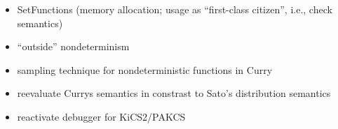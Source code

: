 \documentclass[
12pt, %
a4paper, %
oneside, %
]{llncs}
\begin{document}
\begin{itemize}
\item SetFunctions (memory allocation; usage as ``first-class
  citizen'', i.e., check semantics)
\item ``outside'' nondeterminism
\item sampling technique for nondeterministic functions in Curry
\item reevaluate Currys semantics in constrast to Sato's distribution
  semantics
\item reactivate debugger for KiCS2/PAKCS
\end{itemize}



\end{document}
